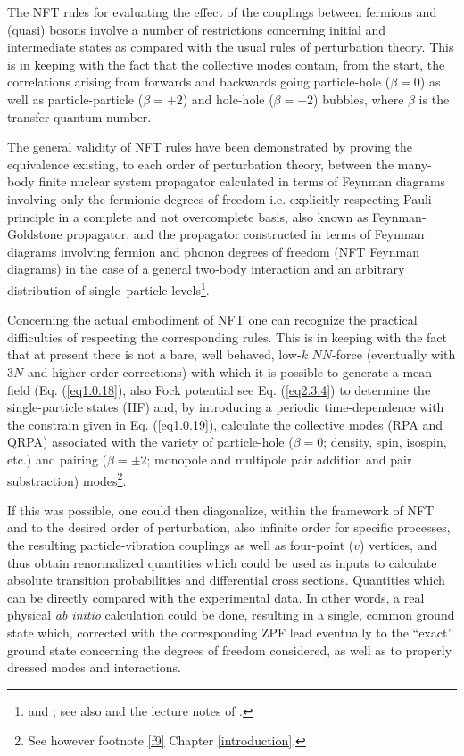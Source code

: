 The NFT rules  for evaluating the effect of the couplings between fermions and (quasi) bosons involve a number of restrictions concerning initial and intermediate states as compared with the usual rules of perturbation theory. This is in keeping with the fact that the collective modes contain, from the start,  the correlations arising from forwards and backwards going  particle-hole ($\beta=0$) as well as particle-particle ($\beta=+2$) and hole-hole ($\beta=-2$) bubbles, where $\beta$ is the transfer quantum number. 
 

The general validity of NFT rules have been demonstrated by proving the equivalence existing, to each order of perturbation theory, between the many-body finite nuclear system propagator calculated in terms of Feynman diagrams involving only the fermionic degrees of freedom i.e. explicitly respecting Pauli principle in a complete and not overcomplete basis, also known as Feynman-Goldstone propagator, and the propagator constructed in terms of Feynman diagrams involving fermion and phonon degrees of freedom (NFT Feynman diagrams) in the case of a general two-body interaction and an arbitrary distribution of single--particle levels\footnote{\cite{Bes:75} and \cite{Bes:76c}; see also \cite{Baranger:69} and the  lecture notes of  \cite{McFarlane:69}.}.



 Concerning the actual embodiment of NFT one can recognize the practical difficulties of respecting the corresponding rules. This is in keeping with the fact that at present there is not a  bare, well behaved, low-$k$ $NN$-force (eventually with 3$N$ and higher order corrections) with which it is possible to generate a mean field (Eq. (\ref{eq1.0.18}), also Fock potential see Eq. (\ref{eq2.3.4})  to determine the single-particle states (HF) and, by introducing a periodic time-dependence with the constrain given in Eq. (\ref{eq1.0.19}),
calculate the collective modes (RPA and QRPA) associated with the variety of particle-hole ($\beta=0$; density, spin, isospin, etc.) and pairing ($\beta=\pm2$; monopole and multipole pair addition and pair substraction) modes\footnote{See however footnote \ref{f9} Chapter \ref{introduction}.}. 


If this was possible, one could then diagonalize, within the framework of NFT and to the desired order of perturbation, also infinite order for specific processes, the resulting particle-vibration couplings as well as four-point ($v$) vertices, and thus obtain renormalized quantities which could be used as inputs to calculate absolute transition probabilities and differential cross sections. Quantities which can be directly compared with the experimental data.
 In other words, a real physical \textit{ab initio} calculation could be done, resulting in a single,  common ground state which, corrected with the corresponding  ZPF lead eventually to the ``exact'' ground state concerning the degrees of freedom considered, as well as to properly dressed modes and  interactions.



